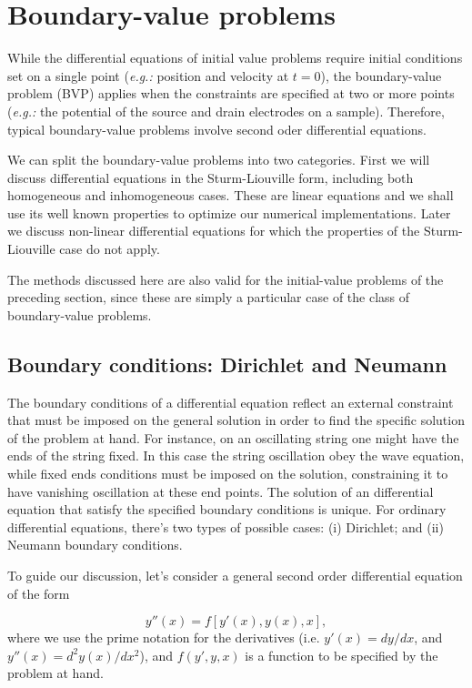\section{Boundary-value problems}

While the differential equations of initial value problems require initial conditions set on a single point (\textit{e.g.:} position and velocity at $t=0$), the boundary-value problem (BVP) applies when the constraints are specified at two or more points (\textit{e.g.:} the potential of the source and drain electrodes on a sample). Therefore, typical boundary-value problems involve second oder differential equations.

We can split the boundary-value problems into two categories. First we will discuss differential equations in the Sturm-Liouville form, including both homogeneous and inhomogeneous cases. These are linear equations and we shall use its well known properties to optimize our numerical implementations. Later we discuss non-linear differential equations for which the properties of the Sturm-Liouville case do not apply.

The methods discussed here are also valid for the initial-value problems of the preceding section, since these are simply a particular case of the class of boundary-value problems. 

\subsection{Boundary conditions: Dirichlet and Neumann}

The boundary conditions of a differential equation reflect an external constraint that must be imposed on the general solution in order to find the specific solution of the problem at hand. For instance, on an oscillating string one might have the ends of the string fixed. In this case the string oscillation obey the wave equation, while fixed ends conditions must be imposed on the solution, constraining it to have vanishing oscillation at these end points. The solution of an differential equation that satisfy the specified boundary conditions is unique. For ordinary differential equations, there's two types of possible cases: (i) Dirichlet; and (ii) Neumann boundary conditions. 

To guide our discussion, let's consider a general second order differential equation of the form

\begin{equation}
 y''(x) = f[y'(x), y(x), x],
\end{equation}
where we use the prime notation for the derivatives (i.e. $y'(x) = dy/dx$, and $y''(x) = d^2y(x)/dx^2$), and $f(y',y,x)$ is a function to be specified by the problem at hand.

